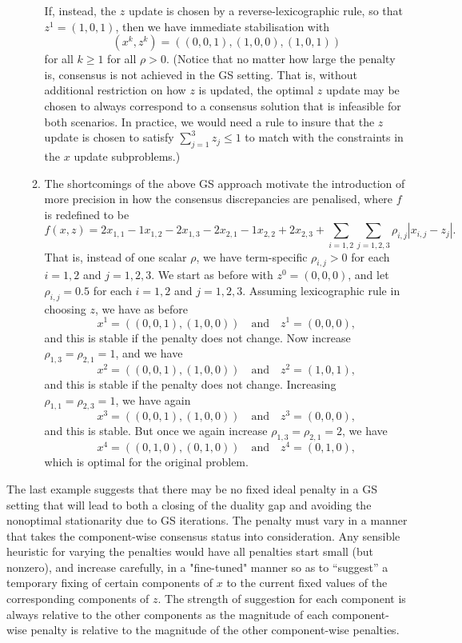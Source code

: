 \documentclass[preprint, 1p, review]{elsarticle}
\begin{document}
\begin{enumerate}
\begin{enumerate}
If, instead, the $z$ update is chosen by a reverse-lexicographic rule, so that $z^1=(1,0,1)$, then we have immediate stabilisation with
$$(x^k,z^k)=\left( (0,0,1),(1,0,0),(1,0,1)\right)$$ for all $k \ge 1$ for all $\rho > 0$. (Notice that no matter how large the penalty is, consensus is not achieved in the GS setting. That is, without additional restriction on how $z$ is updated, the optimal $z$ update may be chosen to always correspond to a consensus solution that is infeasible for both scenarios. In practice, we would need a rule to insure that the $z$ update is chosen to satisfy $\sum_{j=1}^3 z_j \le 1$ to match with the constraints in the $x$ update subproblems.)
\item The shortcomings of the above GS approach motivate the introduction of more precision in how the consensus discrepancies are penalised, where $f$ is redefined to be
\begin{equation*}
f(x,z) = 2x_{1,1}-1x_{1,2}-2x_{1,3} -2x_{2,1} -1 x_{2,2} + 2x_{2,3} + \sum_{i=1,2} \sum_{j=1,2,3} \rho_{i,j}\left| x_{i,j}-z_j \right|.
\end{equation*}
That is, instead of one scalar $\rho$, we have term-specific $\rho_{i,j}>0$ for each $i=1,2$ and $j=1,2,3$. We start as before with $z^0=(0,0,0)$, and let $\rho_{i,j}=0.5$ for each $i=1,2$ and $j=1,2,3$. Assuming lexicographic rule in choosing $z$, we have as before
$$
x^1=\left( (0,0,1),(1,0,0) \right) \quad \text{and} \quad z^1 =(0,0,0),
$$
and this is stable if the penalty does not change.
Now increase $\rho_{1,3}=\rho_{2,1}=1$, and we have 
$$
x^2=\left( (0,0,1),(1,0,0) \right) \quad \text{and} \quad z^2 =(1,0,1),
$$
and this is stable if the penalty does not change. Increasing  $\rho_{1,1}=\rho_{2,3}=1$, we have again
$$
x^3=\left( (0,0,1),(1,0,0) \right) \quad \text{and} \quad z^3 =(0,0,0),
$$
and this is stable. But once we again increase $\rho_{1,3}=\rho_{2,1}=2$, we have
$$
x^4=\left( (0,1,0),(0,1,0) \right) \quad \text{and} \quad z^4 =(0,1,0),
$$
which is optimal for the original problem.
\end{enumerate}
\end{enumerate}

The last example suggests that there may be no fixed ideal penalty in a GS setting that will lead to both a closing of the duality gap and avoiding the nonoptimal stationarity due to GS iterations. The penalty must vary in a manner that takes the component-wise consensus status into consideration. Any sensible heuristic for varying the penalties would have all penalties start small (but nonzero), and increase carefully, in a "fine-tuned" manner so as to ``suggest'' a temporary fixing of certain components of $x$ to the current fixed values of the corresponding components of $z$. The strength of suggestion for each component is always relative to the other components as the magnitude of each component-wise penalty is relative to the magnitude of the other component-wise penalties. 
\end{document}
